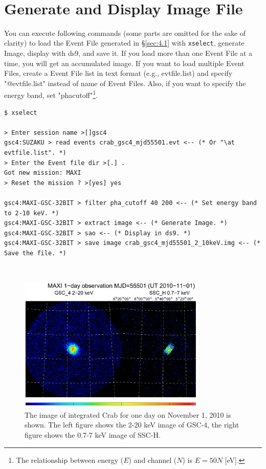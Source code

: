 \documentclass[10pt]{report}
\makeatletter
\renewcommand{\_}{\textscale{.5}{\textbf{\textunderscore}}}
\newcommand{\at}{\makeatletter @\makeatother}
\makeatother
\begin{document}
\

\section{Generate and Display Image File}\label{sec:4.2}

You can execute following commands (some parts are omitted for the sake of clarity) to load the Event File generated in \S\ref{sec:4.1} with \texttt{xselect}, generate Image, display with ds9, and save it. If you load more than one Event File at a time, you will get an accumulated image. If you want to load multiple Event Files, create a Event File list in text format (e.g., evtfile.list) and specify "\at evtfile.list" instead of name of Event Files. Also, if you want to specify the energy band, set "pha\_cutoff"\footnote{The relationship between energy ($E$) and channel ($N$) is $E = 50N$ [eV].}. \\

\begin{lstlisting}
$ xselect

> Enter session name >[]gsc4
gsc4:SUZAKU > read events crab_gsc4_mjd55501.evt <-- (* Or "\at evtfile.list". *)
> Enter the Event file dir >[.] .
Got new mission: MAXI
> Reset the mission ? >[yes] yes

gsc4:MAXI-GSC-32BIT > filter pha_cutoff 40 200 <-- (* Set energy band to 2-10 keV. *)
gsc4:MAXI-GSC-32BIT > extract image <-- (* Generate Image. *)
gsc4:MAXI-GSC-32BIT > sao <-- (* Display in ds9. *)
gsc4:MAXI-GSC-32BIT > save image crab_gsc4_mjd55501_2_10keV.img <-- (* Save the file. *)
\end{lstlisting}

\

\begin{figure}[hbtp!]
  \centering
  \includegraphics[width=0.8\textwidth]{4_1.png}
  \caption{The image of integrated Crab for one day on November 1, 2010 is shown. The left figure shows the 2-20 keV image of GSC-4, the right figure shows the 0.7-7 keV image of SSC-H.}
  \label{fig:1}
\end{figure}
\end{document}
